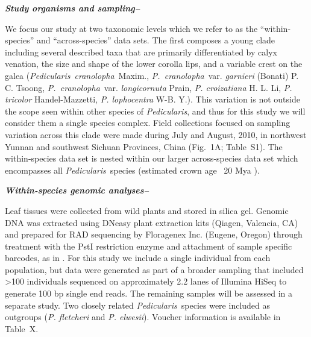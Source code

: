 \documentclass[12pt,letterpaper]{article}
\def\PC{\emph{P.~cranolopha}}
\def\P{\emph{Pedicularis}}
\renewcommand{\subsection}[1]{%
\bigskip
{\noindent \normalfont \bf \emph{#1}}
}
\begin{document}
\subsection{Study organisms and sampling--}
We focus our study at two taxonomic levels which we refer to as the ``within-species'' and ``across-species'' data sets. The first composes a young clade including several described taxa that are primarily differentiated by calyx venation, the size and shape of the lower corolla lips, and a variable crest on the galea (\P~\emph{cranolopha}~Maxim., \PC~var. \emph{garnieri} (Bonati) P. C. Tsoong, \PC~var. \emph{longicornuta} Prain, \emph{P. croizatiana} H. L. Li, \emph{P. tricolor} Handel-Mazzetti, \emph{P. lophocentra} W-B. Y.). This variation is not outside the scope seen within other species of \P, and thus for this study we will consider them a single species complex. Field collections focused on sampling variation across this clade were made during July and August, 2010, in northwest Yunnan and southwest Sichuan Provinces, China (Fig.~1A; Table~S1). The within-species data set is nested within our larger across-species data set which encompasses all \P~species (estimated crown age ~20 Mya \citep{ree_new_paper}). %

\subsection{Within-species genomic analyses--}
Leaf tissues were collected from wild plants and stored in silica gel. Genomic DNA was extracted using DNeasy plant extraction kits (Qiagen, Valencia, CA) and prepared for RAD sequencing by Floragenex Inc. (Eugene, Oregon) through treatment with the PstI restriction enzyme and attachment of sample specific barcodes, as in \citep{baird_rapid_2008}. For this study we include a single individual from each population, but data were generated as part of a broader sampling that included >100 individuals sequenced on approximately 2.2 lanes of Illumina HiSeq to generate 100 bp single end reads. The remaining samples will be assessed in a separate study. Two closely related \P~species were included as outgroups (\emph{P. fletcheri} and \emph{P. elwesii}). Voucher information is available in Table~X. 
\end{document}
